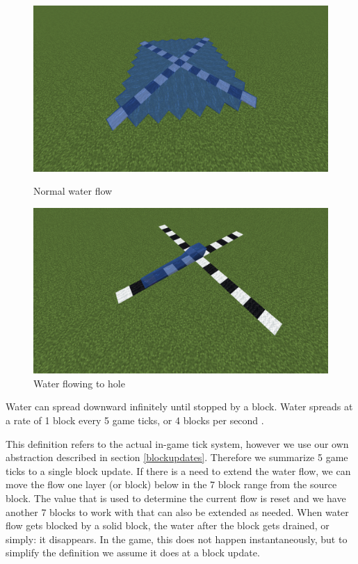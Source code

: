 \begin{figure}[ht]
  \centering
  \begin{minipage}[b]{0.4\textwidth}
    \includegraphics[width=\textwidth]{images/waterflownoair.png}
    \caption{Normal water flow}
    \label{fig:normalflow}
  \end{minipage}
  \hfill
  \begin{minipage}[b]{0.4\textwidth}
    \includegraphics[width=\textwidth]{images/waterflowhole.png}
    \caption{Water flowing to hole}
    \label{fig:holeflow}
  \end{minipage}
\end{figure}
\pagebreak


 \noindent Water can spread downward infinitely until stopped by a block. Water spreads at a rate of 1 block every 5 game ticks, or 4 blocks per second \cite{minecraftfandom:waterspread}.

\noindent This definition refers to the actual in-game tick system, however we use our own abstraction described in section \ref{blockupdates}.
Therefore we summarize 5 game ticks to a single block update.
\newline If there is a need to extend the water flow, we can move the flow one layer (or block) below in the 7 block range from the source block.
The value that is used to determine the current flow is reset and we have another 7 blocks to work with that can also be extended as needed.
\newline When water flow gets blocked by a solid block, the water after the block gets drained, or simply: it disappears. In the game, this does not happen instantaneously, but to simplify the definition we assume it does at a block update.

